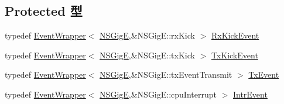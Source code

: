 \subsection*{Protected 型}
\begin{DoxyCompactItemize}
\item 
typedef \hyperlink{classEventWrapper}{EventWrapper}$<$ \hyperlink{classNSGigE}{NSGigE},\&NSGigE::rxKick $>$ \hyperlink{classNSGigE_a0a3db9762c2f631ffb1611b087cd169d}{RxKickEvent}
\item 
typedef \hyperlink{classEventWrapper}{EventWrapper}$<$ \hyperlink{classNSGigE}{NSGigE},\&NSGigE::txKick $>$ \hyperlink{classNSGigE_ab315242c8bda6591956e9398694d56b8}{TxKickEvent}
\item 
typedef \hyperlink{classEventWrapper}{EventWrapper}$<$ \hyperlink{classNSGigE}{NSGigE},\&NSGigE::txEventTransmit $>$ \hyperlink{classNSGigE_a46cfd25d3b5e1c5aed9e237df531a5ff}{TxEvent}
\item 
typedef \hyperlink{classEventWrapper}{EventWrapper}$<$ \hyperlink{classNSGigE}{NSGigE},\&NSGigE::cpuInterrupt $>$ \hyperlink{classNSGigE_ae1de6e495f71d1ee11882b86bde201d4}{IntrEvent}
\end{DoxyCompactItemize}
